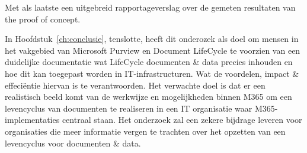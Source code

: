 Met als laatste een uitgebreid rapportageverslag over de gemeten resultaten van the proof of concept.



In Hoofdstuk~\ref{ch:conclusie}, tenslotte, heeft dit onderozek als doel om mensen in het vakgebied van Microsoft Purview en Document LifeCycle te voorzien van een duidelijke documentatie wat LifeCycle documenten \& data precies inhouden en hoe dit kan toegepast worden in IT-infrastructuren. Wat de voordelen, impact \& effeciëntie hiervan is te verantwoorden. Het verwachte doel is dat er een realistisch beeld komt van de werkwijze en mogelijkheden binnen M365 om een levencyclus van documenten te realiseren in een IT organisatie waar M365-implementaties centraal staan.
Het onderzoek zal een zekere bijdrage leveren voor organisaties die meer informatie vergen te trachten over het opzetten van een levencyclus voor documenten \& data.

